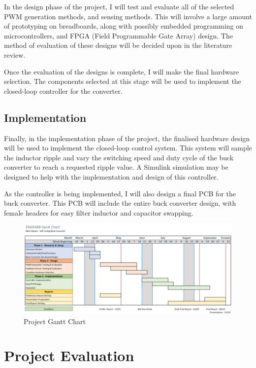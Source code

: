 \documentclass[11pt, a4paper, twoside, openright]{report}
\begin{document}
In the design phase of the project, I will test and evaluate all of the selected PWM generation methods, and sensing methods. This will involve a large amount of prototyping on breadboards, along with possibly embedded programming on microcontrollers, and FPGA (Field Programmable Gate Array) design. The method of evaluation of these designs will be decided upon in the literature review.  

Once the evaluation of the designs is complete, I will make the final hardware selection. The components selected at this stage will be used to implement the closed-loop controller for the converter.

\subsection{Implementation}

Finally, in the implementation phase of the project, the finalised hardware design will be used to implement the closed-loop control system. This system will sample the inductor ripple and vary the switching speed and duty cycle of the buck converter to reach a requested ripple value. A Simulink simulation may be designed to help with the implementation and design of this controller.  

As the controller is being implemented, I will also design a final PCB for the buck converter. This PCB will include the entire buck converter design, with female headers for easy filter inductor and capacitor swapping.

\begin{figure}[!h]
  \begin{center}
    \includegraphics[width = \linewidth]{gantt.png} 
    \caption{Project Gantt Chart}
    \label{fig:gantt}
  \end{center}
\end{figure} 

\newpage
\section{Project Evaluation}
\end{document}
